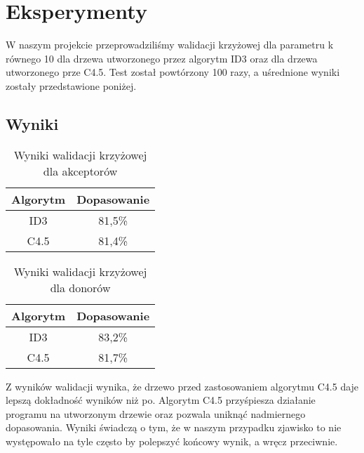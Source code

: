 \section{Eksperymenty}
W naszym projekcie przeprowadziliśmy walidacji krzyżowej dla parametru k równego 10 dla drzewa utworzonego przez algorytm ID3 oraz dla drzewa utworzonego prze C4.5. Test został powtórzony 100 razy, a uśrednione wyniki zostały przedstawione poniżej.

\subsection{Wyniki}



\begin{table}[H]
    \centering
    \begin{tabular}{|c|c|}
    \hline
    Algorytm                & Dopasowanie         \\ \hline
    ID3                     & 81,5\%              \\ \hline
    C4.5                    & 81,4\%              \\ \hline
    \end{tabular}
    \caption{Wyniki walidacji krzyżowej dla akceptorów}
    \label{tab:crossing}
\end{table}

\begin{table}[H]
    \centering
    \begin{tabular}{|c|c|}
    \hline
    Algorytm                & Dopasowanie         \\ \hline
    ID3                     & 83,2\%              \\ \hline
    C4.5                    & 81,7\%              \\ \hline
    \end{tabular}
    \caption{Wyniki walidacji krzyżowej dla donorów}
    \label{tab:crossing}
\end{table}

Z wyników walidacji wynika, że drzewo przed zastosowaniem algorytmu C4.5 daje lepszą dokładność wyników niż po. Algorytm C4.5 przyśpiesza działanie programu na utworzonym drzewie oraz pozwala uniknąć nadmiernego dopasowania. Wyniki świadczą o tym, że w naszym przypadku zjawisko to nie występowało na tyle często by polepszyć końcowy wynik, a wręcz przeciwnie.


